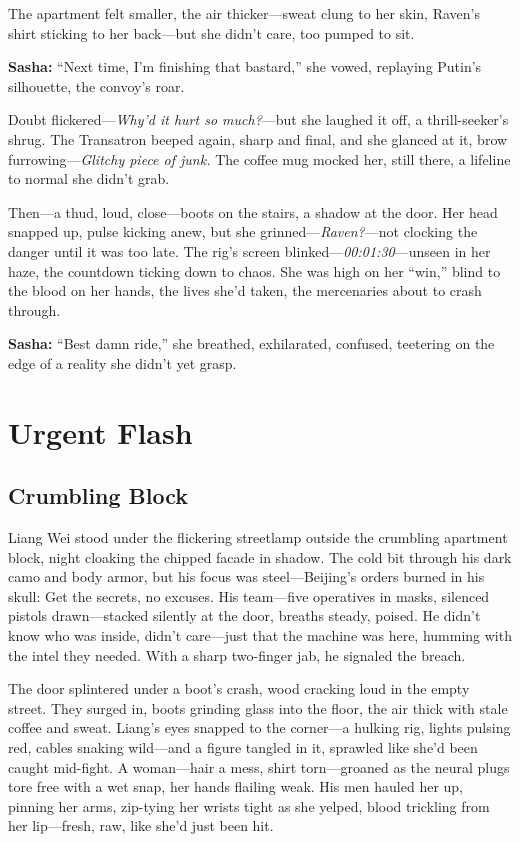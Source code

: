 \documentclass[12pt]{book}
\begin{document}
The apartment felt smaller, the air thicker—sweat clung to her skin, Raven’s shirt sticking to her back—but she didn’t care, too pumped to sit. 

\vspace{0.5em}
\textbf{Sasha:} “Next time, I’m finishing that bastard,” she vowed, replaying Putin’s silhouette, the convoy’s roar.

Doubt flickered—\emph{Why’d it hurt so much?}—but she laughed it off, a thrill-seeker’s shrug. The Transatron beeped again, sharp and final, and she glanced at it, brow furrowing—\emph{Glitchy piece of junk.} The coffee mug mocked her, still there, a lifeline to normal she didn’t grab.

Then—a thud, loud, close—boots on the stairs, a shadow at the door. Her head snapped up, pulse kicking anew, but she grinned—\emph{Raven?}—not clocking the danger until it was too late. The rig’s screen blinked—\emph{00:01:30}—unseen in her haze, the countdown ticking down to chaos. She was high on her “win,” blind to the blood on her hands, the lives she’d taken, the mercenaries about to crash through. 

\vspace{0.5em}
\textbf{Sasha:} “Best damn ride,” she breathed, exhilarated, confused, teetering on the edge of a reality she didn’t yet grasp.

\vspace{1em}
 
\chapter{Urgent Flash}

\section{Crumbling Block}

Liang Wei stood under the flickering streetlamp outside the crumbling apartment block, night cloaking the chipped facade in shadow. The cold bit through his dark camo and body armor, but his focus was steel—Beijing’s orders burned in his skull: Get the secrets, no excuses. His team—five operatives in masks, silenced pistols drawn—stacked silently at the door, breaths steady, poised. He didn’t know who was inside, didn’t care—just that the machine was here, humming with the intel they needed. With a sharp two-finger jab, he signaled the breach.

The door splintered under a boot’s crash, wood cracking loud in the empty street. They surged in, boots grinding glass into the floor, the air thick with stale coffee and sweat. Liang’s eyes snapped to the corner—a hulking rig, lights pulsing red, cables snaking wild—and a figure tangled in it, sprawled like she’d been caught mid-fight. A woman—hair a mess, shirt torn—groaned as the neural plugs tore free with a wet snap, her hands flailing weak. His men hauled her up, pinning her arms, zip-tying her wrists tight as she yelped, blood trickling from her lip—fresh, raw, like she’d just been hit.
\end{document}
